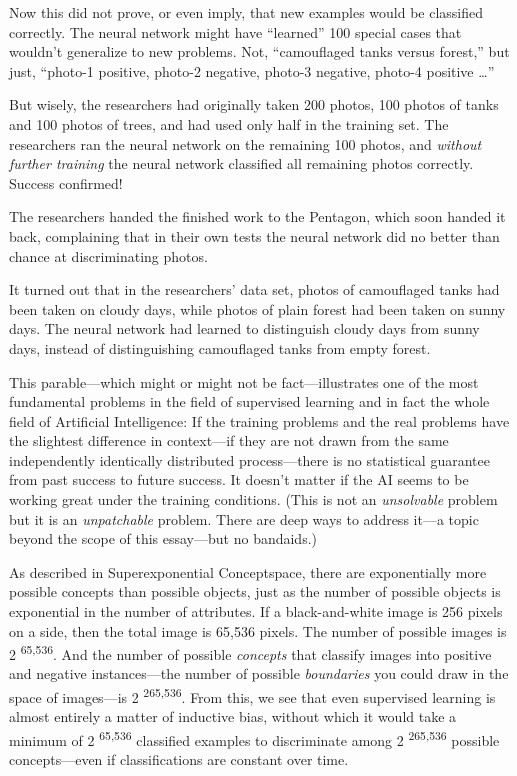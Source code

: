 {
 Now this did not prove, or even imply, that new examples would be
classified correctly. The neural network might have
``learned'' 100 special cases that
wouldn't generalize to new problems. Not,
``camouflaged tanks versus forest,''
but just, ``photo-1 positive, photo-2 negative,
photo-3 negative, photo-4 positive \ldots''}

{
 But wisely, the researchers had originally taken 200 photos, 100
photos of tanks and 100 photos of trees, and had used only half in the
training set. The researchers ran the neural network on the remaining
100 photos, and \textit{without further training} the neural network
classified all remaining photos correctly. Success confirmed!}

{
 The researchers handed the finished work to the Pentagon, which
soon handed it back, complaining that in their own tests the neural
network did no better than chance at discriminating photos.}

{
 It turned out that in the researchers' data set,
photos of camouflaged tanks had been taken on cloudy days, while photos
of plain forest had been taken on sunny days. The neural network had
learned to distinguish cloudy days from sunny days, instead of
distinguishing camouflaged tanks from empty forest.}

{
 This parable---which might or might not be fact---illustrates one
of the most fundamental problems in the field of supervised learning
and in fact the whole field of Artificial Intelligence: If the training
problems and the real problems have the slightest difference in
context---if they are not drawn from the same independently identically
distributed process---there is no statistical guarantee from past
success to future success. It doesn't matter if the AI
seems to be working great under the training conditions. (This is not
an \textit{unsolvable} problem but it is an \textit{unpatchable}
problem. There are deep ways to address it---a topic beyond the scope
of this essay---but no bandaids.)}

{
 As described in Superexponential Conceptspace, there are
exponentially more possible concepts than possible objects, just as the
number of possible objects is exponential in the number of attributes.
If a black-and-white image is 256 pixels on a side, then the total
image is 65,536 pixels. The number of possible images is
2\textsuperscript{ 65,536}. And the number of possible \textit{concepts}
that classify images into positive and negative instances---the number
of possible \textit{boundaries} you could draw in the space of
images---is 2\textsuperscript{ 265,536}. From this, we see that even
supervised learning is almost entirely a matter of inductive bias,
without which it would take a minimum of 2\textsuperscript{ 65,536}
classified examples to discriminate among 2\textsuperscript{ 265,536}
possible concepts---even if classifications are constant over time.}

